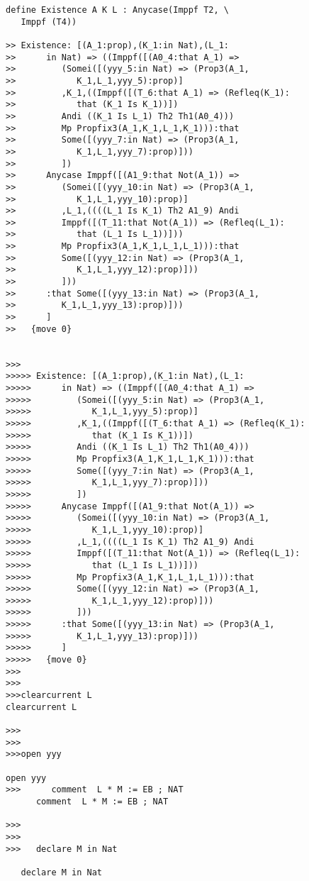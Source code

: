 \documentclass{article}
\begin{document}
\begin{verbatim}
define Existence A K L : Anycase(Imppf T2, \
   Imppf (T4))

>> Existence: [(A_1:prop),(K_1:in Nat),(L_1:
>>      in Nat) => ((Imppf([(A0_4:that A_1) =>
>>         (Somei([(yyy_5:in Nat) => (Prop3(A_1,
>>            K_1,L_1,yyy_5):prop)]
>>         ,K_1,((Imppf([(T_6:that A_1) => (Refleq(K_1):
>>            that (K_1 Is K_1))])
>>         Andi ((K_1 Is L_1) Th2 Th1(A0_4)))
>>         Mp Propfix3(A_1,K_1,L_1,K_1))):that
>>         Some([(yyy_7:in Nat) => (Prop3(A_1,
>>            K_1,L_1,yyy_7):prop)]))
>>         ])
>>      Anycase Imppf([(A1_9:that Not(A_1)) =>
>>         (Somei([(yyy_10:in Nat) => (Prop3(A_1,
>>            K_1,L_1,yyy_10):prop)]
>>         ,L_1,((((L_1 Is K_1) Th2 A1_9) Andi
>>         Imppf([(T_11:that Not(A_1)) => (Refleq(L_1):
>>            that (L_1 Is L_1))]))
>>         Mp Propfix3(A_1,K_1,L_1,L_1))):that
>>         Some([(yyy_12:in Nat) => (Prop3(A_1,
>>            K_1,L_1,yyy_12):prop)]))
>>         ]))
>>      :that Some([(yyy_13:in Nat) => (Prop3(A_1,
>>         K_1,L_1,yyy_13):prop)]))
>>      ]
>>   {move 0}


>>>
>>>>> Existence: [(A_1:prop),(K_1:in Nat),(L_1:
>>>>>      in Nat) => ((Imppf([(A0_4:that A_1) =>
>>>>>         (Somei([(yyy_5:in Nat) => (Prop3(A_1,
>>>>>            K_1,L_1,yyy_5):prop)]
>>>>>         ,K_1,((Imppf([(T_6:that A_1) => (Refleq(K_1):
>>>>>            that (K_1 Is K_1))])
>>>>>         Andi ((K_1 Is L_1) Th2 Th1(A0_4)))
>>>>>         Mp Propfix3(A_1,K_1,L_1,K_1))):that
>>>>>         Some([(yyy_7:in Nat) => (Prop3(A_1,
>>>>>            K_1,L_1,yyy_7):prop)]))
>>>>>         ])
>>>>>      Anycase Imppf([(A1_9:that Not(A_1)) =>
>>>>>         (Somei([(yyy_10:in Nat) => (Prop3(A_1,
>>>>>            K_1,L_1,yyy_10):prop)]
>>>>>         ,L_1,((((L_1 Is K_1) Th2 A1_9) Andi
>>>>>         Imppf([(T_11:that Not(A_1)) => (Refleq(L_1):
>>>>>            that (L_1 Is L_1))]))
>>>>>         Mp Propfix3(A_1,K_1,L_1,L_1))):that
>>>>>         Some([(yyy_12:in Nat) => (Prop3(A_1,
>>>>>            K_1,L_1,yyy_12):prop)]))
>>>>>         ]))
>>>>>      :that Some([(yyy_13:in Nat) => (Prop3(A_1,
>>>>>         K_1,L_1,yyy_13):prop)]))
>>>>>      ]
>>>>>   {move 0}
>>>
>>>
>>>clearcurrent L
clearcurrent L

>>>
>>>
>>>open yyy

open yyy
>>>      comment  L * M := EB ; NAT
      comment  L * M := EB ; NAT

>>>
>>>
>>>   declare M in Nat

   declare M in Nat


\end{verbatim}
\end{document}
